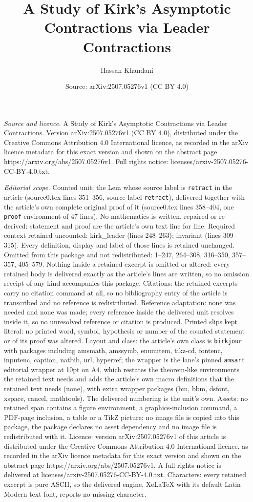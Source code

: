 \documentclass[10pt,a4paper]{amsart}
\title[A Study of Kirk's Asymptotic Contractions via Leader Contrac]{A Study of Kirk's Asymptotic Contractions via Leader Contractions}
\author{Hassan Khandani}
\date{Source: arXiv:2507.05276v1 (CC BY 4.0)}
\begin{document}
\maketitle

\noindent\emph{Source and licence.} A Study of Kirk's Asymptotic Contractions via Leader Contractions. Version arXiv:2507.05276v1 (CC BY 4.0), distributed under the Creative Commons Attribution 4.0 International licence, as recorded in the arXiv licence metadata for this exact version and shown on the abstract page https://arxiv.org/abs/2507.05276v1. Full rights notice: licenses/arxiv-2507.05276-CC-BY-4.0.txt.\par\smallskip

\noindent\textit{Editorial scope.} Counted unit: the Lem whose source label is \texttt{retract} in the article (source0.tex lines 351--356, source label \texttt{retract}), delivered together with the article's own complete original proof of it (source0.tex lines 358--404, one \texttt{proof} environment of 47 lines). No mathematics is written, repaired or re-derived: statement and proof are the article's own text line for line. Required context retained uncounted: kirk\_leader (lines 248--263); invariant (lines 309--315). Every definition, display and label of those lines is retained unchanged. Omitted from this package and not redistributed: 1--247, 264--308, 316--350, 357--357, 405--579. Nothing inside a retained excerpt is omitted or altered: every retained body is delivered exactly as the article's lines are written, so no omission receipt of any kind accompanies this package. Citations: the retained excerpts carry no citation command at all, so no bibliography entry of the article is transcribed and no reference is redistributed. Reference adaptation: none was needed and none was made; every reference inside the delivered unit resolves inside it, so no unresolved reference or citation is produced. Printed slips kept literal: no printed word, symbol, hypothesis or number of the counted statement or of its proof was altered. Layout and class: the article's own class is \texttt{birkjour} with packages including amsmath, amssymb, enumitem, tikz-cd, fontenc, inputenc, caption, natbib, url, hyperref; the wrapper is the lane's pinned \texttt{amsart} editorial wrapper at 10pt on A4, which restates the theorem-like environments the retained text needs and adds the article's own macro definitions that the retained text needs (none), with extra wrapper packages (bm, bbm, dsfont, xspace, cancel, mathtools). The delivered numbering is the unit's own. Assets: no retained span contains a figure environment, a graphics-inclusion command, a PDF-page inclusion, a table or a TikZ picture; no image file is copied into this package, the package declares no asset dependency and no image file is redistributed with it. Licence: version arXiv:2507.05276v1 of this article is distributed under the Creative Commons Attribution 4.0 International licence, as recorded in the arXiv licence metadata for this exact version and shown on the abstract page https://arxiv.org/abs/2507.05276v1. A full rights notice is delivered at licenses/arxiv-2507.05276-CC-BY-4.0.txt. Characters: every retained excerpt is pure ASCII, so the delivered engine, XeLaTeX with its default Latin Modern text font, reports no missing character.
\end{document}
